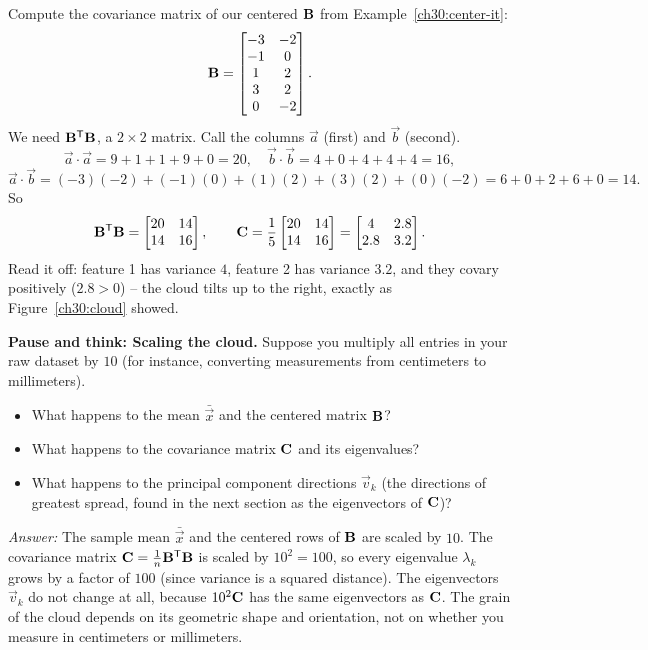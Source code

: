 \begin{example}\label{ch30:cov-compute}
Compute the covariance matrix of our centered $\mathbf{B}$ from
Example~\ref{ch30:center-it}:
\[
  \mathbf{B} =
  \begin{bmatrix}
    -3 & -2\\ -1 & 0\\ 1 & 2\\ 3 & 2\\ 0 & -2
  \end{bmatrix}.
\]
We need $\mathbf{B}^{\mathsf{T}}\mathbf{B}$, a $2\times2$ matrix. Call the columns $\vec a$ (first)
and $\vec b$ (second).
\[
  \vec a\cdot\vec a = 9+1+1+9+0 = 20,\quad
  \vec b\cdot\vec b = 4+0+4+4+4 = 16,
\]
\[
  \vec a\cdot\vec b = (-3)(-2)+(-1)(0)+(1)(2)+(3)(2)+(0)(-2)=6+0+2+6+0=14.
\]
So
\[
  \mathbf{B}^{\mathsf{T}}\mathbf{B}=\begin{bmatrix}20 & 14\\ 14 & 16\end{bmatrix},
  \qquad
  \mathbf{C}=\frac15\begin{bmatrix}20 & 14\\ 14 & 16\end{bmatrix}
        =\begin{bmatrix}4 & 2.8\\ 2.8 & 3.2\end{bmatrix}.
\]
Read it off: feature 1 has variance $4$, feature 2 has variance $3.2$, and they
covary positively ($2.8>0$) -- the cloud tilts up to the right, exactly as
Figure~\ref{ch30:cloud} showed.
\end{example}

\begin{recoverybox}
\textbf{Pause and think: Scaling the cloud.}
Suppose you multiply all entries in your raw dataset by $10$ (for instance,
converting measurements from centimeters to millimeters).
\begin{itemize}
  \item What happens to the mean $\bar{\vec x}$ and the centered matrix $\mathbf{B}$?
  \item What happens to the covariance matrix $\mathbf{C}$ and its eigenvalues?
  \item What happens to the principal component directions $\vec v_k$ (the
        directions of greatest spread, found in the next section as the
        eigenvectors of $\mathbf{C}$)?
\end{itemize}
\emph{Answer:} The sample mean $\bar{\vec x}$ and the centered rows of $\mathbf{B}$
are scaled by $10$. The covariance matrix $\mathbf{C} = \tfrac1n\mathbf{B}^{\mathsf{T}}\mathbf{B}$ is
scaled by $10^2 = 100$, so every eigenvalue $\lambda_k$ grows by a factor of $100$
(since variance is a squared distance). The eigenvectors $\vec v_k$ do not
change at all, because $10^2\mathbf{C}$ has the same eigenvectors as $\mathbf{C}$. The grain of the cloud depends on its geometric shape and
orientation, not on whether you measure in centimeters or millimeters.
\end{recoverybox}

